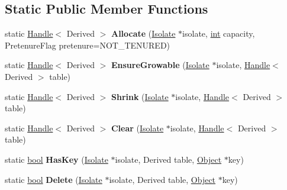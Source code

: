 \subsection*{Static Public Member Functions}
\begin{DoxyCompactItemize}
\item 
\mbox{\label{classv8_1_1internal_1_1OrderedHashTable_ac9d8d23d581f5bd1aff697a408a2d410}} 
static \mbox{\hyperlink{classv8_1_1internal_1_1Handle}{Handle}}$<$ Derived $>$ {\bfseries Allocate} (\mbox{\hyperlink{classv8_1_1internal_1_1Isolate}{Isolate}} $\ast$isolate, \mbox{\hyperlink{classint}{int}} capacity, Pretenure\+Flag pretenure=N\+O\+T\+\_\+\+T\+E\+N\+U\+R\+ED)
\item 
\mbox{\label{classv8_1_1internal_1_1OrderedHashTable_adf3a34fa2caece496650160dc9571e93}} 
static \mbox{\hyperlink{classv8_1_1internal_1_1Handle}{Handle}}$<$ Derived $>$ {\bfseries Ensure\+Growable} (\mbox{\hyperlink{classv8_1_1internal_1_1Isolate}{Isolate}} $\ast$isolate, \mbox{\hyperlink{classv8_1_1internal_1_1Handle}{Handle}}$<$ Derived $>$ table)
\item 
\mbox{\label{classv8_1_1internal_1_1OrderedHashTable_a2484f08d4ff31d439e7ddcbf87df978d}} 
static \mbox{\hyperlink{classv8_1_1internal_1_1Handle}{Handle}}$<$ Derived $>$ {\bfseries Shrink} (\mbox{\hyperlink{classv8_1_1internal_1_1Isolate}{Isolate}} $\ast$isolate, \mbox{\hyperlink{classv8_1_1internal_1_1Handle}{Handle}}$<$ Derived $>$ table)
\item 
\mbox{\label{classv8_1_1internal_1_1OrderedHashTable_a9df589840feb3328fb7adf58a28aa904}} 
static \mbox{\hyperlink{classv8_1_1internal_1_1Handle}{Handle}}$<$ Derived $>$ {\bfseries Clear} (\mbox{\hyperlink{classv8_1_1internal_1_1Isolate}{Isolate}} $\ast$isolate, \mbox{\hyperlink{classv8_1_1internal_1_1Handle}{Handle}}$<$ Derived $>$ table)
\item 
\mbox{\label{classv8_1_1internal_1_1OrderedHashTable_ade55429fdf354b03d1ad746c5831856b}} 
static \mbox{\hyperlink{classbool}{bool}} {\bfseries Has\+Key} (\mbox{\hyperlink{classv8_1_1internal_1_1Isolate}{Isolate}} $\ast$isolate, Derived table, \mbox{\hyperlink{classv8_1_1internal_1_1Object}{Object}} $\ast$key)
\item 
\mbox{\label{classv8_1_1internal_1_1OrderedHashTable_a7e09d28be332663b42d90b754b44173c}} 
static \mbox{\hyperlink{classbool}{bool}} {\bfseries Delete} (\mbox{\hyperlink{classv8_1_1internal_1_1Isolate}{Isolate}} $\ast$isolate, Derived table, \mbox{\hyperlink{classv8_1_1internal_1_1Object}{Object}} $\ast$key)
\end{DoxyCompactItemize}

